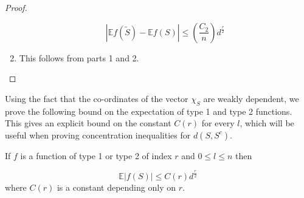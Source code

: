 \documentclass[final,12pt]{colt2018}
\begin{document}
\begin{proof}
\begin{enumerate}
$$|\mathbb{E}f(\tilde{S}) - \mathbb{E}f(S)| \leq \left(\frac{C_2}{n}\right)d^{\frac{r}{2}}$$

\item
This follows from parts 1 and 2.
\end{enumerate}
\end{proof}



Using the fact that the co-ordinates of the vector $\chi_S$ are weakly dependent, we prove the following bound on the expectation of type 1 and type 2 functions. This gives an explicit bound on the constant $C(r)$ for every $l$, which will be useful when proving concentration inequalities for $d(S,S^c)$.



\begin{lemma}
\label{poly_bound_alternate}
If $f$ is a function of type 1 or type 2 of index $r$ and $0\leq l\leq n $ then

$$\mathbb{E}|f(S)| \leq C(r)d^{\frac{r}{2}}$$  where $C(r)$ is a constant depending only on $r$.
\end{lemma}
\end{document}
